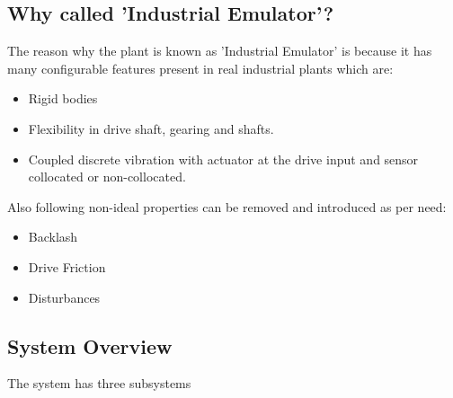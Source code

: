 \documentclass[11pt, a4paper]{article}
\begin{document}
\subsection{Why called 'Industrial Emulator'?}
The reason why the plant is known as ’Industrial Emulator’ is because it has many configurable features present in real industrial plants which are: \\
\begin{itemize}
\item Rigid bodies
\item Flexibility in drive shaft, gearing and shafts.
\item Coupled discrete vibration with actuator at the drive input and sensor collocated or non-collocated.
\end{itemize}
Also following non-ideal properties can be removed and introduced as per need:
\begin{itemize}
\item Backlash
\item Drive Friction
\item Disturbances
\end{itemize}
\subsection{System Overview}
The system has three subsystems
\end{document}
